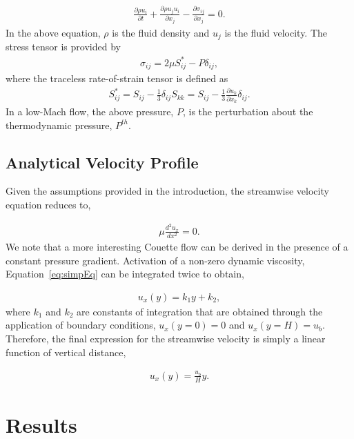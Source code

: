 \documentclass{article}
\begin{document}
\begin{align}
  \frac {\partial \rho u_i }{\partial t} + \frac{ \partial \rho u_j u_i}{\partial x_j} 
-\frac{\partial \sigma_{ij}}{\partial x_j} = 0.
\label{eq:momEq}
\end{align}
%
In the above equation, $\rho$ is the fluid density and $u_j$ is the fluid velocity. 
The stress tensor is provided by
\begin{align}
\sigma_{ij}  = 2 \mu S^*_{ij} - P \delta_{ij},
\end{align}
%
where the traceless rate-of-strain tensor is defined as
\begin{align}
S^*_{ij}  = S_{ij} - \frac{1}{3} \delta_{ij} S_{kk} \nonumber
		     = S_{ij} - \frac{1}{3} \frac{\partial  u_k }{\partial x_k}\delta_{ij}.
\end{align}
In a low-Mach flow, the above pressure, $P$, is the perturbation about the thermodynamic
pressure, $P^{th}$. 

\subsection{Analytical Velocity Profile}
Given the assumptions provided in the introduction, the streamwise velocity equation reduces to,

\begin{align}
   \mu \frac{d^2 u_x}{dx^2} = 0.
\label{eq:simpEq}
\end{align}
We note that a more interesting Couette flow can be derived in the presence of a constant pressure 
gradient. Activation of a non-zero dynamic viscosity, Equation~\ref{eq:simpEq} can be 
integrated twice to obtain,

\begin{align}
  u_x(y) = k_1 y + k_2,
\label{eq:simpEqWithK}
\end{align}
where $k_1$ and $k_2$ are constants of integration that are obtained through the 
application of boundary conditions, $u_x(y=0) = 0$ and  $u_x(y=H) = u_b$. Therefore,
the final expression for the streamwise velocity is simply a linear function of vertical
distance,

\begin{align}
  u_x(y) = \frac{u_b}{H}y.
\label{eq:simpleEqWithoutK}
\end{align}

\section{Results}
\end{document}
